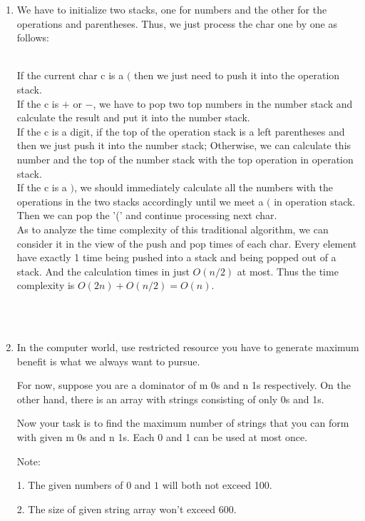 \documentclass[12pt,a4paper]{article}
\makeatletter
\newtheorem*{solution}{Solution}
\renewenvironment{solution}[1][Solution] {\par\pushQED{\qed}\normalfont\topsep6\p@\@plus6\p@\relax\trivlist\item[\hskip\labelsep\bfseries#1\@addpunct{.}]\ignorespaces}{\popQED\endtrivlist\@endpefalse} \makeatother
\makeatother
\begin{document}
\begin{enumerate}
\begin{solution}
We have to initialize two stacks, one for numbers and the other for the operations and parentheses. Thus, we just process the char one by one as follows:

~\\If the current char c is a $($ then we just need to push it into the operation stack.
~\\If the c is $+$ or $-$, we have to pop two top numbers in the number stack and calculate the result and put it into the number stack.
~\\If the c is a digit, if the top of the operation stack is a left parentheses and then we just push it into the number stack; Otherwise, we can calculate this number and the top of the number stack with the top operation in operation stack.
~\\If the c is a $)$, we should immediately calculate all the numbers with the operations in the two stacks accordingly until we meet a $($ in operation stack. Then we can pop the '(' and continue processing next char.
~\\


As to analyze the time complexity of this traditional algorithm, we can consider it in the view of the push and pop times of each char.  Every element have exactly 1 time being pushed into a stack and being popped out of a stack. And the calculation times in just $O(n/2)$ at most. Thus the time complexity is $O(2n) + O(n/2) = O(n)$.

\end{solution}
~\\
~\\
\item
In the computer world, use restricted resource you have to generate maximum benefit is what we always want to pursue.

For now, suppose you are a dominator of m 0s and n 1s respectively. On the other hand, there is an array with strings consisting of only 0s and 1s.

Now your task is to find the maximum number of strings that you can form with given m 0s and n 1s. Each 0 and 1 can be used at most once.

Note:

1. The given numbers of $0$ and $1$ will both not exceed 100.

2. The size of given string array won't exceed 600.




\end{enumerate}
\end{document}
